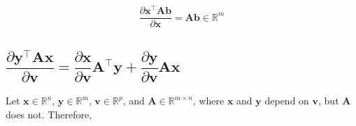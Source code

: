 \documentclass{article}
\newcommand{\trans}{\top}
\begin{document}
\begin{align}
    \boxed{\dfrac{\partial \mathbf{x}^\trans \mathbf{A} \mathbf{b}}{\partial \mathbf{x}} = \mathbf{Ab} \in \mathbb{R}^{m}}
\end{align}


\subsection{\(\dfrac{\partial \mathbf{y}^\trans \mathbf{A} \mathbf{x}}{\partial \mathbf{v}} = \dfrac{\partial \mathbf{x}}{\partial \mathbf{v}} \mathbf{A}^{\trans} \mathbf{y} + \dfrac{\partial \mathbf{y}}{\partial \mathbf{v}} \mathbf{A} \mathbf{x}\)}
Let \(\mathbf{x} \in \mathbb{R}^{n}\), \(\mathbf{y} \in \mathbb{R}^{m}\), \(\mathbf{v} \in \mathbb{R}^{p}\), and \(\mathbf{A}\in \mathbb{R}^{m\times n}\), where \(\mathbf{x}\) and \(\mathbf{y}\) depend on \(\mathbf{v}\), but \(\mathbf{A}\) does not. Therefore,
\end{document}
